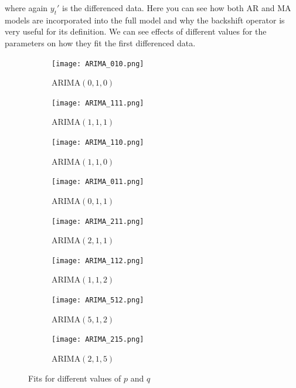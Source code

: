 \documentclass{article}
\begin{document}
  where again $y_t'$ is the differenced data.  Here you can see how both AR and MA models are incorporated into the full model and why the backshift operator is very useful for its definition.
  \newpage
  We can see effects of different values for the parameters on how they fit the first differenced data.
  \begin{figure}[H]
    \centering
    \captionsetup{justification=centering}
    \begin{subfigure}[b]{0.415\linewidth}
      \texttt{[image: ARIMA\_010.png]}
      \caption{ARIMA$(0, 1, 0)$}
    \end{subfigure}
    \begin{subfigure}[b]{0.415\linewidth}
      \texttt{[image: ARIMA\_111.png]}
      \caption{ARIMA$(1, 1, 1)$}
    \end{subfigure}
    \begin{subfigure}[b]{0.415\linewidth}
      \texttt{[image: ARIMA\_110.png]}
      \caption{ARIMA$(1, 1, 0)$}
    \end{subfigure}
    \begin{subfigure}[b]{0.415\linewidth}
      \texttt{[image: ARIMA\_011.png]}
      \caption{ARIMA$(0, 1, 1)$}
    \end{subfigure}
    \begin{subfigure}[b]{0.415\linewidth}
      \texttt{[image: ARIMA\_211.png]}
      \caption{ARIMA$(2, 1, 1)$}
    \end{subfigure}
    \begin{subfigure}[b]{0.415\linewidth}
      \texttt{[image: ARIMA\_112.png]}
      \caption{ARIMA$(1, 1, 2)$}
    \end{subfigure}
    \begin{subfigure}[b]{0.415\linewidth}
      \texttt{[image: ARIMA\_512.png]}
      \caption{ARIMA$(5, 1, 2)$}
    \end{subfigure}
    \begin{subfigure}[b]{0.415\linewidth}
      \texttt{[image: ARIMA\_215.png]}
      \caption{ARIMA$(2, 1, 5)$}
    \end{subfigure}
    \caption{Fits for different values of $p$ and $q$}
  \end{figure}
\end{document}
